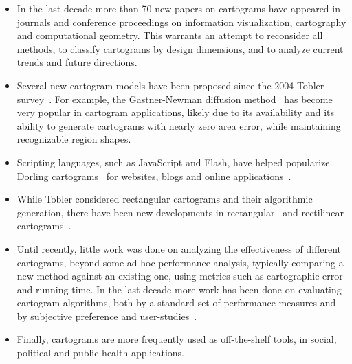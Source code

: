 \documentclass{egpubl}
\begin{document}
\begin{itemize}

\item In the last decade more than 70 new papers on cartograms have appeared in journals and conference proceedings on information visualization, cartography and computational geometry. This warrants an attempt to reconsider all methods, to classify cartograms by design dimensions, and to analyze current trends and future directions.
\item Several new cartogram models have been proposed since the 2004 Tobler survey~\cite{Tobler04}. For example, the Gastner-Newman diffusion method~\cite{GN04} has become very popular in cartogram applications, likely due to its availability and its ability to generate cartograms with nearly zero area error, while maintaining recognizable region shapes. 
\item Scripting languages, such as JavaScript and Flash, have helped popularize Dorling cartograms~\cite{dorling96} for websites, blogs and online applications~\cite{NYT_O,Hans,Hans2,Proto}. 
\item While Tobler considered rectangular cartograms and their algorithmic generation, there have been new developments in rectangular~\cite{ks07,BSV12} and rectilinear cartograms~\cite{ourSoCG}.
\item Until recently, little work was done on analyzing the effectiveness of different cartograms, beyond some ad hoc performance analysis, typically comparing a new method against an existing one, using metrics such as cartographic error and running time. 
In the last decade more work has been done on evaluating cartogram algorithms, both by a standard set of performance measures and by subjective preference and user-studies~\cite{AKV15,kaspar2013empirical,NusratAK15}. 
\item Finally, cartograms are more frequently used as off-the-shelf tools, in social, political and public health applications.
\end{itemize}






















\end{document}
